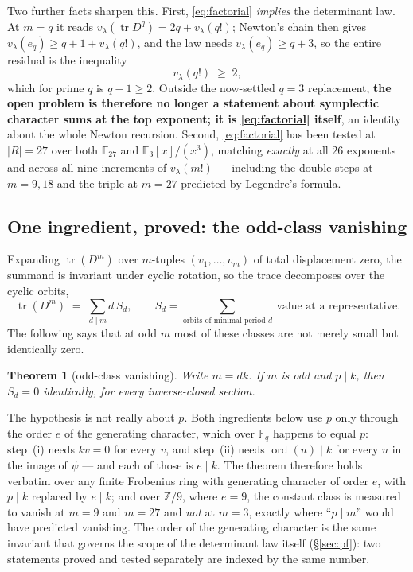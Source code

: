 \documentclass[11pt]{article}
\theoremstyle{plain}
\newtheorem{theorem}{Theorem}
\theoremstyle{definition}
\newcommand{\FF}{\mathbb F}
\newcommand{\ZZ}{\mathbb Z}
\newcommand{\tr}{\operatorname{tr}}
\newcommand{\vlam}{v_\lambda}
\begin{document}
Two further facts sharpen this. First, \eqref{eq:factorial} \emph{implies} the
determinant law. At $m=q$ it reads $\vlam(\tr D^q)=2q+\vlam(q!)$; Newton's
chain then gives $\vlam(e_q)\ge q+1+\vlam(q!)$, and the law needs
$\vlam(e_q)\ge q+3$, so the entire residual is the inequality
\[
\vlam(q!)\;\ge\;2 ,
\]
which for prime $q$ is $q-1\ge2$. Outside the now-settled $q=3$ replacement,
\textbf{the open problem is therefore no longer a statement about symplectic
character sums at the top exponent; it is \eqref{eq:factorial} itself}, an
identity about the whole Newton recursion.
Second, \eqref{eq:factorial} has been tested at $|R|=27$ over both $\FF_{27}$
and $\FF_3[x]/(x^3)$, matching \emph{exactly} at all $26$ exponents and across
all nine increments of $\vlam(m!)$ --- including the double steps at $m=9,18$
and the triple at $m=27$ predicted by Legendre's formula.

\subsection{One ingredient, proved: the odd-class vanishing}
\label{sec:oddclass}

Expanding $\tr(D^m)$ over $m$-tuples $(v_1,\dots,v_m)$ of total displacement
zero, the summand is invariant under cyclic rotation, so the trace decomposes
over the cyclic orbits,
\[
\tr(D^m)\;=\;\sum_{d\mid m} d\,S_d ,\qquad
S_d=\sum_{\text{orbits of minimal period }d}\ \text{value at a representative}.
\]
The following says that at odd $m$ most of these classes are not merely small
but identically zero.

\begin{theorem}[odd-class vanishing]\label{thm:oddclass}
Write $m=dk$. If $m$ is odd and $p\mid k$, then $S_d=0$ identically, for every
inverse-closed section.
\end{theorem}

\noindent The hypothesis is not really about $p$. Both ingredients below use
$p$ only through the order $e$ of the generating character, which over $\FF_q$
happens to equal $p$: step~(i) needs $kv=0$ for every $v$, and step~(ii) needs
$\operatorname{ord}(u)\mid k$ for every $u$ in the image of $\psi$ --- and each
of those is $e\mid k$. The theorem therefore holds verbatim over any finite
Frobenius ring with generating character of order $e$, with $p\mid k$ replaced
by $e\mid k$; and over $\ZZ/9$, where $e=9$, the constant class is measured to
vanish at $m=9$ and $m=27$ and \emph{not} at $m=3$, exactly where ``$p\mid m$''
would have predicted vanishing. The order of the generating character is the
same invariant that governs the scope of the determinant law itself
(\S\ref{sec:pf}): two statements proved and tested separately are indexed by
the same number.
\end{document}
